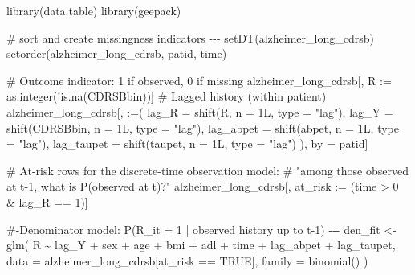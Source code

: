 \documentclass[
  9pt,
  letterpaper,
  DIV=11,
  numbers=noendperiod]{scrartcl}
\newenvironment{Shaded}{\begin{snugshade}}{\end{snugshade}}
\newcommand{\AttributeTok}[1]{\textcolor[rgb]{0.40,0.45,0.13}{#1}}
\newcommand{\CommentTok}[1]{\textcolor[rgb]{0.37,0.37,0.37}{#1}}
\newcommand{\ConstantTok}[1]{\textcolor[rgb]{0.56,0.35,0.01}{#1}}
\newcommand{\DecValTok}[1]{\textcolor[rgb]{0.68,0.00,0.00}{#1}}
\newcommand{\ErrorTok}[1]{\textcolor[rgb]{0.68,0.00,0.00}{#1}}
\newcommand{\FunctionTok}[1]{\textcolor[rgb]{0.28,0.35,0.67}{#1}}
\newcommand{\NormalTok}[1]{\textcolor[rgb]{0.00,0.23,0.31}{#1}}
\newcommand{\OtherTok}[1]{\textcolor[rgb]{0.00,0.23,0.31}{#1}}
\newcommand{\SpecialCharTok}[1]{\textcolor[rgb]{0.37,0.37,0.37}{#1}}
\newcommand{\StringTok}[1]{\textcolor[rgb]{0.13,0.47,0.30}{#1}}
\begin{document}
\begin{Shaded}
\begin{Highlighting}[]
\FunctionTok{library}\NormalTok{(data.table)}
\FunctionTok{library}\NormalTok{(geepack)}

\CommentTok{\# sort and create missingness indicators {-}{-}{-}}
\FunctionTok{setDT}\NormalTok{(alzheimer\_long\_cdrsb)}
\FunctionTok{setorder}\NormalTok{(alzheimer\_long\_cdrsb, patid, time)}

\CommentTok{\# Outcome indicator: 1 if observed, 0 if missing}
\NormalTok{alzheimer\_long\_cdrsb[, R }\SpecialCharTok{:}\ErrorTok{=} \FunctionTok{as.integer}\NormalTok{(}\SpecialCharTok{!}\FunctionTok{is.na}\NormalTok{(CDRSBbin))]}
\CommentTok{\# Lagged history (within patient)}
\NormalTok{alzheimer\_long\_cdrsb[, }\StringTok{\textasciigrave{}}\AttributeTok{:=}\StringTok{\textasciigrave{}}\NormalTok{(}
  \AttributeTok{lag\_R      =} \FunctionTok{shift}\NormalTok{(R,        }\AttributeTok{n =} \DecValTok{1}\NormalTok{L, }\AttributeTok{type =} \StringTok{"lag"}\NormalTok{),}
  \AttributeTok{lag\_Y      =} \FunctionTok{shift}\NormalTok{(CDRSBbin, }\AttributeTok{n =} \DecValTok{1}\NormalTok{L, }\AttributeTok{type =} \StringTok{"lag"}\NormalTok{),}
  \AttributeTok{lag\_abpet  =} \FunctionTok{shift}\NormalTok{(abpet,    }\AttributeTok{n =} \DecValTok{1}\NormalTok{L, }\AttributeTok{type =} \StringTok{"lag"}\NormalTok{),}
  \AttributeTok{lag\_taupet =} \FunctionTok{shift}\NormalTok{(taupet,   }\AttributeTok{n =} \DecValTok{1}\NormalTok{L, }\AttributeTok{type =} \StringTok{"lag"}\NormalTok{)}
\NormalTok{), by }\OtherTok{=}\NormalTok{ patid]}

\CommentTok{\# At{-}risk rows for the discrete{-}time observation model:}
\CommentTok{\# "among those observed at t{-}1, what is P(observed at t)?"}
\NormalTok{alzheimer\_long\_cdrsb[, at\_risk }\SpecialCharTok{:}\ErrorTok{=}\NormalTok{ (time }\SpecialCharTok{\textgreater{}} \DecValTok{0} \SpecialCharTok{\&}\NormalTok{ lag\_R }\SpecialCharTok{==} \DecValTok{1}\NormalTok{)]}

\CommentTok{\#{-}Denominator model: P(R\_it = 1 | observed history up to t{-}1) {-}{-}{-}}
\NormalTok{den\_fit }\OtherTok{\textless{}{-}} \FunctionTok{glm}\NormalTok{(}
\NormalTok{  R }\SpecialCharTok{\textasciitilde{}}\NormalTok{ lag\_Y }\SpecialCharTok{+}\NormalTok{ sex }\SpecialCharTok{+}\NormalTok{ age }\SpecialCharTok{+}\NormalTok{ bmi }\SpecialCharTok{+}\NormalTok{ adl }\SpecialCharTok{+}\NormalTok{ time }\SpecialCharTok{+}\NormalTok{ lag\_abpet }\SpecialCharTok{+}\NormalTok{ lag\_taupet,}
  \AttributeTok{data   =}\NormalTok{ alzheimer\_long\_cdrsb[at\_risk }\SpecialCharTok{==} \ConstantTok{TRUE}\NormalTok{],}
  \AttributeTok{family =} \FunctionTok{binomial}\NormalTok{()}
\NormalTok{)}


\end{Highlighting}
\end{Shaded}
\end{document}
